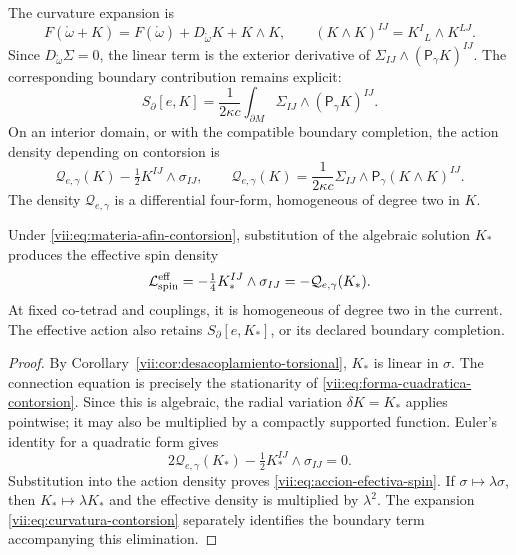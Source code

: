 The curvature expansion is
\begin{equation}
 F(\mathring\omega+K)
 =F(\mathring\omega)+D_{\mathring\omega}K+K\wedge K,
 \qquad (K\wedge K)^{IJ}=K^I{}_{L}\wedge K^{LJ}.
 \label{vii:eq:curvatura-contorsion}
\end{equation}
Since \(D_{\mathring\omega}\Sigma=0\), the linear term is
the exterior derivative of \(\Sigma_{IJ}\wedge(\mathsf P_\gamma K)^{IJ}\).
The corresponding boundary contribution remains explicit:
\begin{equation}
 S_\partial[e,K]=\frac1{2\kappa c}
     \int_{\partial M}\Sigma_{IJ}\wedge(\mathsf P_\gamma K)^{IJ}.
 \label{vii:eq:borde-contorsion}
\end{equation}
On an interior domain, or with the compatible boundary completion,
the action density depending on contorsion is
\begin{equation}
 \mathcal Q_{e,\gamma}(K)-\tfrac12K^{IJ}\wedge\sigma_{IJ},
 \qquad
 \mathcal Q_{e,\gamma}(K)
  =\frac1{2\kappa c}\Sigma_{IJ}\wedge
                         \mathsf P_\gamma(K\wedge K)^{IJ}.
 \label{vii:eq:forma-cuadratica-contorsion}
\end{equation}
The density \(\mathcal Q_{e,\gamma}\) is a differential
four-form, homogeneous of degree two in \(K\).

\begin{theorem}
\label{vii:thm:respuesta-cuadratica}
Under \eqref{vii:eq:materia-afin-contorsion}, substitution of the
algebraic solution \(K_*\) produces the effective spin density
\begin{equation}
 \mathcal L_{\rm spin}^{\rm eff}
 =-\tfrac14 K_*^{IJ}\wedge\sigma_{IJ}
 =-\mathcal Q_{e,\gamma}(K_*).
 \label{vii:eq:accion-efectiva-spin}
\end{equation}
At fixed co-tetrad and couplings, it is homogeneous of degree two in
the current. The effective action also retains
\(S_\partial[e,K_*]\), or its declared boundary completion.
\end{theorem}
\begin{proof}
By Corollary~\ref{vii:cor:desacoplamiento-torsional},
\(K_*\) is linear in \(\sigma\). The connection equation is
precisely the stationarity of
\eqref{vii:eq:forma-cuadratica-contorsion}. Since this is algebraic,
the radial variation \(\delta K=K_*\) applies pointwise;
it may also be multiplied by a compactly supported function.
Euler's identity for a quadratic form gives
\[
 2\mathcal Q_{e,\gamma}(K_*)
             -\tfrac12K_*^{IJ}\wedge\sigma_{IJ}=0.
\]
Substitution into the action density proves
\eqref{vii:eq:accion-efectiva-spin}. If
\(\sigma\mapsto\lambda\sigma\), then
\(K_*\mapsto\lambda K_*\) and the effective density is
multiplied by \(\lambda^2\). The expansion
\eqref{vii:eq:curvatura-contorsion} separately identifies the
boundary term accompanying this elimination.
\end{proof}

